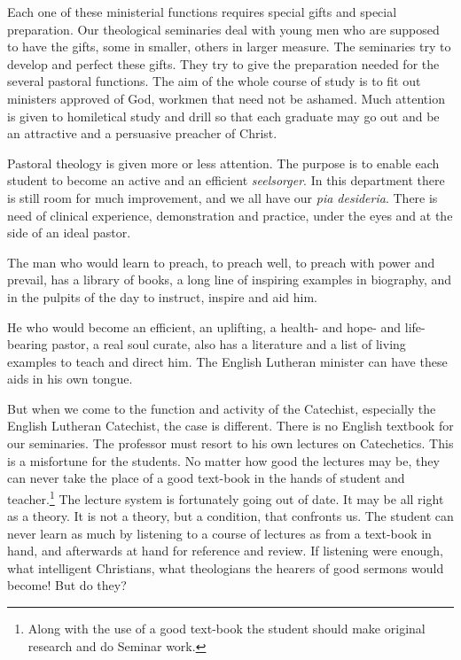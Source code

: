 Each one of these ministerial functions requires special gifts and special preparation. Our theological seminaries deal with young men who are supposed to have the gifts, some in smaller, others in larger measure. The seminaries try to develop and perfect these gifts. They try to give the preparation needed for the several pastoral functions. The aim of the whole course of study is to fit out ministers approved of God, workmen that need not be ashamed. Much attention is given to homiletical study and drill so that each graduate may go out
and be an attractive and a persuasive preacher of Christ.

 Pastoral theology is given more or less attention. The purpose is to enable each student to become an active and an efficient \emph{seelsorger}. In this department there is still room for much improvement, and we all have our \emph{pia desideria}. There is need of clinical experience, demonstration and practice, under the eyes and at the side of an ideal pastor.

The man who would learn to preach, to preach well, to preach with power and prevail, has a library of books, a long line of inspiring examples in biography, and in the pulpits of the day to instruct, inspire and aid him.

He who would become an efficient, an uplifting, a health- and hope- and life-bearing pastor, a real soul curate, also has a literature and a list of living examples to teach and direct him. The English Lutheran minister can have these aids in his own tongue.

But when we come to the function and activity of the Catechist, especially the English Lutheran Catechist, the case is different. There is no English textbook for our seminaries. The professor must resort to his own lectures on Catechetics. This is a misfortune for the students. No matter how good the lectures may be, they can never take the place of a
good text-book in the hands of student and teacher.\footnote{Along with the use of a good text-book the student should make original research and do Seminar work.}  The lecture system is fortunately going out of date. It may be all right as a theory. It is not a theory, but a condition, that confronts us. The student can never learn as much by listening to a course of lectures as from a text-book in hand, and afterwards at hand for reference and review. If listening were enough, what intelligent Christians, what theologians the hearers of good sermons would become! But do they?

